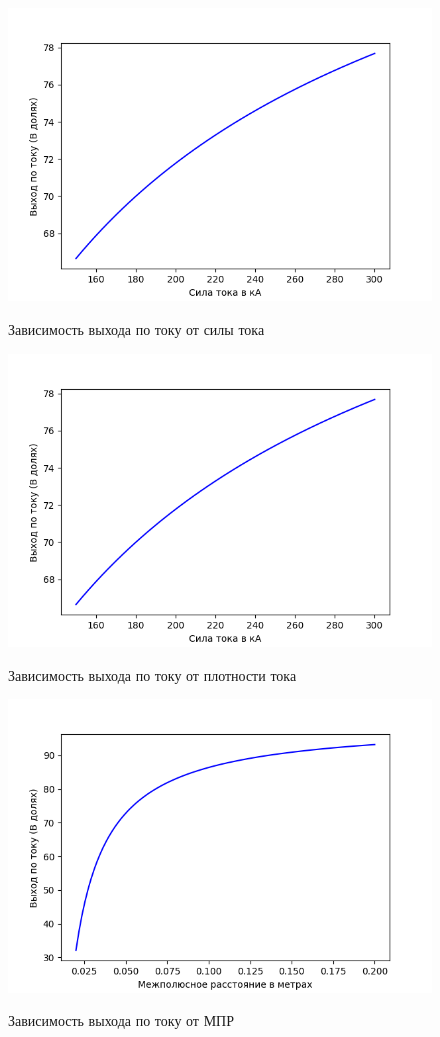 \documentclass{article}
\begin{document}
\begin{figure}[H]
\centering
\includegraphics[width=0.8\linewidth]{I.png}
\caption{}
Зависимость выхода по току от силы тока
\label{fig:IPlot}
\end{figure}

\begin{figure}[H]
\centering
\includegraphics[width=0.8\linewidth]{i.png}
\caption{}
\label{fig:iPlot}
Зависимость выхода по току от плотности тока
\end{figure}

\begin{figure}[H]
\centering
\includegraphics[width=0.8\linewidth]{L.png}
\caption{}
\label{fig:LPlot}
Зависимость выхода по току от МПР
\end{figure}
\end{document}
